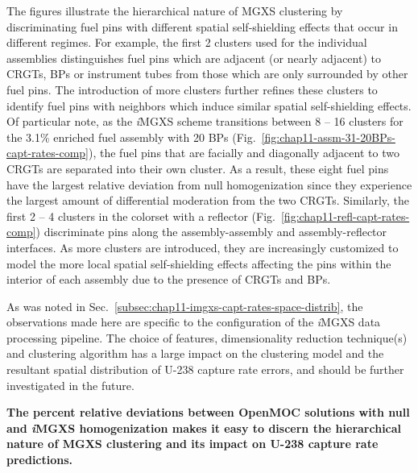 The figures illustrate the hierarchical nature of \ac{MGXS} clustering by discriminating fuel pins with different spatial self-shielding effects that occur in different regimes. For example, the first 2 clusters used for the individual assemblies distinguishes fuel pins which are adjacent (or nearly adjacent) to \acp{CRGT}, \acp{BP} or instrument tubes from those which are only surrounded by other fuel pins. The introduction of more clusters further refines these clusters to identify fuel pins with neighbors which induce similar spatial self-shielding effects. Of particular note, as the \textit{i}\ac{MGXS} scheme transitions between 8 -- 16 clusters for the 3.1\% enriched fuel assembly with 20 \acp{BP} (Fig.~\ref{fig:chap11-assm-31-20BPs-capt-rates-comp}), the fuel pins that are facially and diagonally adjacent to two \acp{CRGT} are separated into their own cluster. As a result, these eight fuel pins have the largest relative deviation from null homogenization since they experience the largest amount of differential moderation from the two \acp{CRGT}. Similarly, the first 2 -- 4 clusters in the colorset with a reflector (Fig.~\ref{fig:chap11-refl-capt-rates-comp}) discriminate pins along the assembly-assembly and assembly-reflector interfaces. As more clusters are introduced, they are increasingly customized to model the more local spatial self-shielding effects affecting the pins within the interior of each assembly due to the presence of \acp{CRGT} and \acp{BP}.

As was noted in Sec.~\ref{subsec:chap11-imgxs-capt-rates-space-distrib}, the observations made here are specific to the configuration of the \textit{i}\ac{MGXS} data processing pipeline. The choice of features, dimensionality reduction technique(s) and clustering algorithm has a large impact on the clustering model and the resultant spatial distribution of U-238 capture rate errors, and should be further investigated in the future.

\begin{emphbox}
\textbf{The percent relative deviations between OpenMOC solutions with null and \textit{i}\ac{MGXS} homogenization makes it easy to discern the hierarchical nature of \ac{MGXS} clustering and its impact on U-238 capture rate predictions.}
\end{emphbox}



